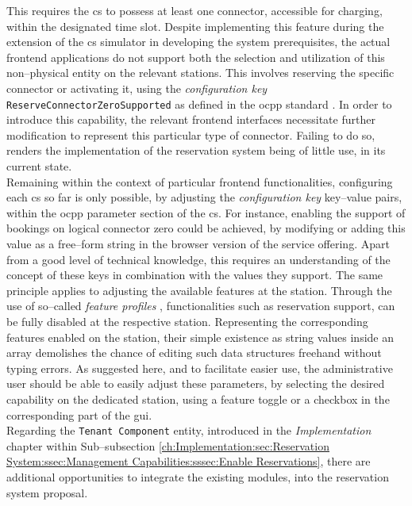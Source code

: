 This requires the \acrshort{cs} to possess at least one connector, accessible for charging, within the designated time slot.
Despite implementing this feature during the extension of the \acrshort{cs} simulator in developing the system prerequisites, the actual frontend applications do not support both the selection and utilization of this non--physical entity on the relevant stations.
This involves reserving the specific connector or activating it, using the \textit{configuration key} \texttt{ReserveConnectorZeroSupported} as defined in the \acrshort{ocpp} standard \cite{noauthor_ocpp_nodate}.
In order to introduce this capability, the relevant frontend interfaces necessitate further modification to represent this particular type of connector. Failing to do so, renders the implementation of the reservation system being of little use, in its current state. \\
Remaining within the context of particular frontend functionalities, configuring each \acrshort{cs} so far is only possible, by adjusting the \textit{configuration key} key--value pairs, within the \acrshort{ocpp} parameter section of the \acrshort{cs}.
For instance, enabling the support of bookings on logical connector zero could be achieved, by modifying or adding this value as a free--form string in the browser version of the service offering. 
Apart from a good level of technical knowledge, this requires an understanding of the concept of these keys in combination with the values they support. 
The same principle applies to adjusting the available features at the station. Through the use of so--called \textit{feature profiles} \cite{noauthor_ocpp_nodate}, functionalities such as reservation support, can be fully disabled at the respective station.
Representing the corresponding features enabled on the station, their simple existence as string values inside an array demolishes the chance of editing such data structures freehand without typing errors.
As suggested here, and to facilitate easier use, the administrative user should be able to easily adjust these parameters, by selecting the desired capability on the dedicated station, using a feature toggle or a checkbox in the corresponding part of the \acrshort{gui}. \\
Regarding the \texttt{Tenant Component} entity, introduced in the \textit{Implementation} chapter within Sub--subsection \ref{ch:Implementation:sec:Reservation System:ssec:Management Capabilities:sssec:Enable Reservations}, there are additional opportunities to integrate the existing modules, into the reservation system proposal. 
